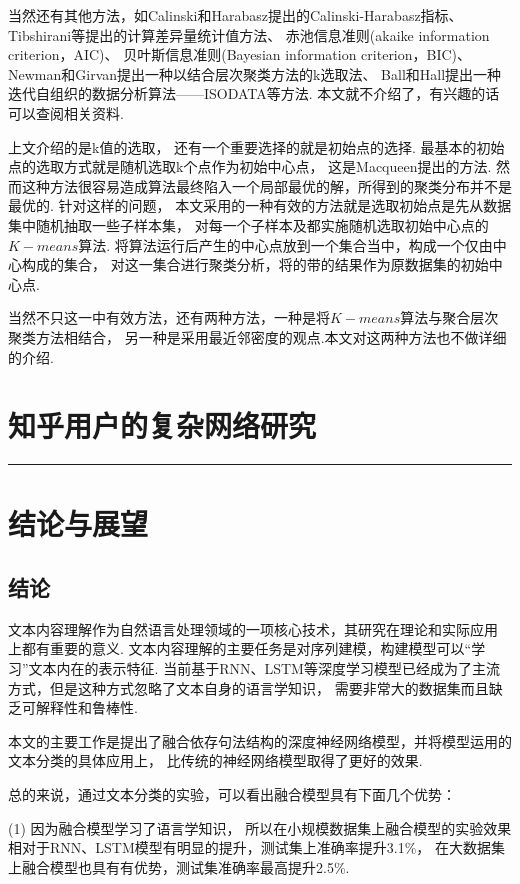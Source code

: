 \documentclass[bachelor,adobefonts]{jnuthesis}
\begin{document}
当然还有其他方法，如Calinski和Harabasz提出的Calinski-Harabasz指标、
Tibshirani等提出的计算差异量统计值方法、
赤池信息准则(akaike information criterion，AIC)、
贝叶斯信息准则(Bayesian information criterion，BIC)、
Newman和Girvan提出一种以结合层次聚类方法的k选取法、
Ball和Hall提出一种迭代自组织的数据分析算法——ISODATA等方法.
本文就不介绍了，有兴趣的话可以查阅相关资料.

上文介绍的是k值的选取，
还有一个重要选择的就是初始点的选择.
最基本的初始点的选取方式就是随机选取k个点作为初始中心点，
这是Macqueen提出的方法.
然而这种方法很容易造成算法最终陷入一个局部最优的解，所得到的聚类分布并不是最优的.
针对这样的问题，
本文采用的一种有效的方法就是选取初始点是先从数据集中随机抽取一些子样本集，
对每一个子样本及都实施随机选取初始中心点的$K-means$算法.
将算法运行后产生的中心点放到一个集合当中，构成一个仅由中心构成的集合，
对这一集合进行聚类分析，将的带的结果作为原数据集的初始中心点.



当然不只这一中有效方法，还有两种方法，一种是将$K-means$算法与聚合层次聚类方法相结合，
另一种是采用最近邻密度的观点.本文对这两种方法也不做详细的介绍.


\chapter{知乎用户的复杂网络研究}



\rule{\textwidth}{0.5pt}


\chapter{结论与展望}
\section{结论}
文本内容理解作为自然语言处理领域的一项核心技术，其研究在理论和实际应用
上都有重要的意义.
文本内容理解的主要任务是对序列建模，构建模型可以“学习”文本内在的表示特征.
当前基于RNN、LSTM等深度学习模型已经成为了主流方式，但是这种方式忽略了文本自身的语言学知识，
需要非常大的数据集而且缺乏可解释性和鲁棒性.

本文的主要工作是提出了融合依存句法结构的深度神经网络模型，并将模型运用的文本分类的具体应用上，
比传统的神经网络模型取得了更好的效果.

总的来说，通过文本分类的实验，可以看出融合模型具有下面几个优势：

(1) 因为融合模型学习了语言学知识，
所以在小规模数据集上融合模型的实验效果相对于RNN、LSTM模型有明显的提升，测试集上准确率提升3.1\%，
在大数据集上融合模型也具有有优势，测试集准确率最高提升2.5\%.
\end{document}

